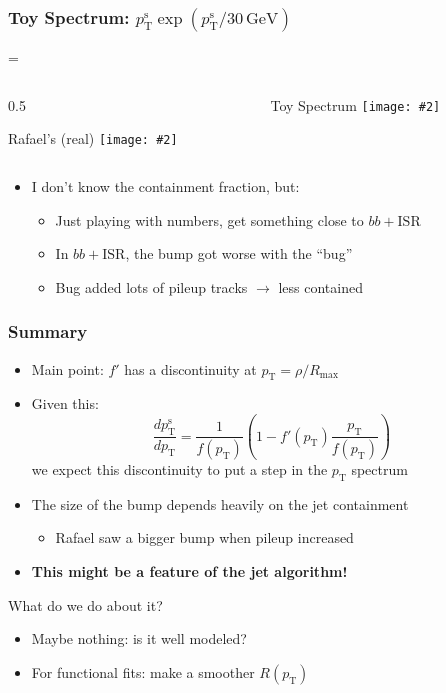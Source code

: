 \documentclass[xcolor={table}]{beamer}
\newcommand{\pt}{p_{\mathrm{T}}}
\newcommand{\ptr}{\pt}
\newcommand{\ptt}{\pt^{\text{s}}}
\newcommand{\graphic}[2][0.99]{\texttt{[image: \#2]}}
\newcommand{\twocol}[3][0.5]{
  \newdimen\scwid
  \scwid=\dimexpr\textwidth-#1\textwidth\relax
  \begin{columns}
    \begin{column}{#1\textwidth}#2\end{column}
      \begin{column}{\scwid}#3\end{column}
  \end{columns}
}
\begin{document}
\begin{frame}
  \frametitle{Toy Spectrum: $\ptt \exp(\ptt / 30\, \text{GeV})$}
  \twocol{
    \begin{center}
      Rafael's (real)
      \graphic{trkjet1_pt.png}
    \end{center}
  }{
    \begin{center}
      Toy Spectrum
      \graphic{{spec.pdf}}
    \end{center}
  }
  \begin{itemize}
  \item I don't know the containment fraction, but:
    \begin{itemize}
    \item Just playing with numbers, get something close to $bb + \text{ISR}$
    \item In $bb + \text{ISR}$, the bump got worse with the ``bug''
    \item Bug added lots of pileup tracks $\to$ less contained
    \end{itemize}
  \end{itemize}
\end{frame}

\begin{frame}
  \frametitle{Summary}
  \begin{itemize}
  \item Main point: $f'$ has a discontinuity at $\ptr = \rho / R_{\text{max}}$
  \item Given this:
    \[ \frac{d\ptt}{d\ptr} = \frac{1}{f(\ptr)} \left( 1 - f'(\ptr) \frac{\ptr}{f(\ptr)} \right) \]
    we expect this discontinuity to put a step in the $\ptr$ spectrum
  \item The size of the bump depends heavily on the jet containment
    \begin{itemize}
    \item Rafael saw a bigger bump when pileup increased
    \end{itemize}
  \item \textbf{This might be a feature of the jet algorithm!}
  \end{itemize}
  \begin{block}{What do we do about it?}
    \begin{itemize}
    \item Maybe nothing: is it well modeled?
    \item For functional fits: make a smoother $R(\ptr)$
    \end{itemize}
  \end{block}
\end{frame}



\end{document}
